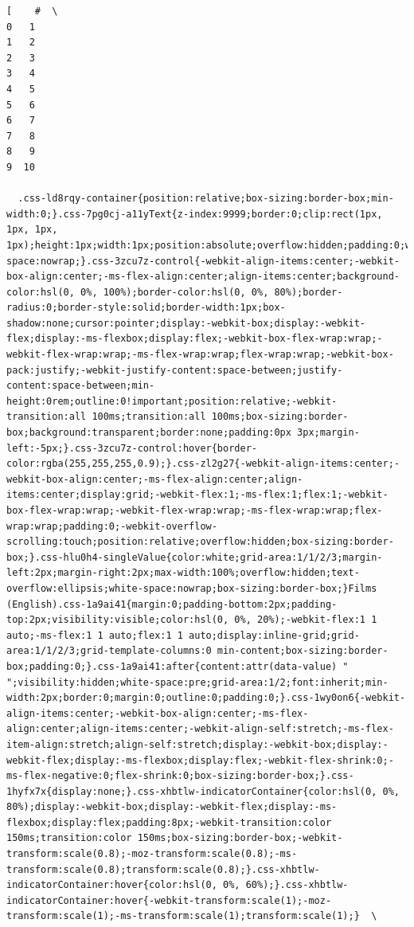\documentclass[
  letterpaper,
  DIV=11,
  numbers=noendperiod]{scrreprt}
\begin{document}
\begin{verbatim}
[    #  \
0   1   
1   2   
2   3   
3   4   
4   5   
5   6   
6   7   
7   8   
8   9   
9  10   

  .css-ld8rqy-container{position:relative;box-sizing:border-box;min-width:0;}.css-7pg0cj-a11yText{z-index:9999;border:0;clip:rect(1px, 1px, 1px, 1px);height:1px;width:1px;position:absolute;overflow:hidden;padding:0;white-space:nowrap;}.css-3zcu7z-control{-webkit-align-items:center;-webkit-box-align:center;-ms-flex-align:center;align-items:center;background-color:hsl(0, 0%, 100%);border-color:hsl(0, 0%, 80%);border-radius:0;border-style:solid;border-width:1px;box-shadow:none;cursor:pointer;display:-webkit-box;display:-webkit-flex;display:-ms-flexbox;display:flex;-webkit-box-flex-wrap:wrap;-webkit-flex-wrap:wrap;-ms-flex-wrap:wrap;flex-wrap:wrap;-webkit-box-pack:justify;-webkit-justify-content:space-between;justify-content:space-between;min-height:0rem;outline:0!important;position:relative;-webkit-transition:all 100ms;transition:all 100ms;box-sizing:border-box;background:transparent;border:none;padding:0px 3px;margin-left:-5px;}.css-3zcu7z-control:hover{border-color:rgba(255,255,255,0.9);}.css-zl2g27{-webkit-align-items:center;-webkit-box-align:center;-ms-flex-align:center;align-items:center;display:grid;-webkit-flex:1;-ms-flex:1;flex:1;-webkit-box-flex-wrap:wrap;-webkit-flex-wrap:wrap;-ms-flex-wrap:wrap;flex-wrap:wrap;padding:0;-webkit-overflow-scrolling:touch;position:relative;overflow:hidden;box-sizing:border-box;}.css-hlu0h4-singleValue{color:white;grid-area:1/1/2/3;margin-left:2px;margin-right:2px;max-width:100%;overflow:hidden;text-overflow:ellipsis;white-space:nowrap;box-sizing:border-box;}Films (English).css-1a9ai41{margin:0;padding-bottom:2px;padding-top:2px;visibility:visible;color:hsl(0, 0%, 20%);-webkit-flex:1 1 auto;-ms-flex:1 1 auto;flex:1 1 auto;display:inline-grid;grid-area:1/1/2/3;grid-template-columns:0 min-content;box-sizing:border-box;padding:0;}.css-1a9ai41:after{content:attr(data-value) " ";visibility:hidden;white-space:pre;grid-area:1/2;font:inherit;min-width:2px;border:0;margin:0;outline:0;padding:0;}.css-1wy0on6{-webkit-align-items:center;-webkit-box-align:center;-ms-flex-align:center;align-items:center;-webkit-align-self:stretch;-ms-flex-item-align:stretch;align-self:stretch;display:-webkit-box;display:-webkit-flex;display:-ms-flexbox;display:flex;-webkit-flex-shrink:0;-ms-flex-negative:0;flex-shrink:0;box-sizing:border-box;}.css-1hyfx7x{display:none;}.css-xhbtlw-indicatorContainer{color:hsl(0, 0%, 80%);display:-webkit-box;display:-webkit-flex;display:-ms-flexbox;display:flex;padding:8px;-webkit-transition:color 150ms;transition:color 150ms;box-sizing:border-box;-webkit-transform:scale(0.8);-moz-transform:scale(0.8);-ms-transform:scale(0.8);transform:scale(0.8);}.css-xhbtlw-indicatorContainer:hover{color:hsl(0, 0%, 60%);}.css-xhbtlw-indicatorContainer:hover{-webkit-transform:scale(1);-moz-transform:scale(1);-ms-transform:scale(1);transform:scale(1);}  \

\end{verbatim}
\end{document}
